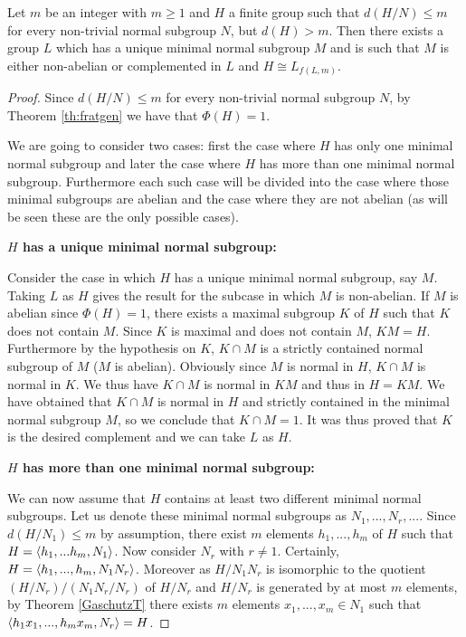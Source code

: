 \begin{theorem}
    Let $m$ be an integer with $m \ge 1$ and $H$ a finite group such that $d(H/N) \le m$ for every non-trivial normal subgroup $N$, but $d(H) > m$. Then there exists a group $L$ which has a unique minimal normal subgroup $M$ and is such that $M$ is either non-abelian or complemented in $L$ and $H \cong L_{f(L,m)}$.
\end{theorem}
\begin{proof}
    Since $d(H/N) \le m$ for every non-trivial normal subgroup $N$, by Theorem \ref{th:fratgen} we have that $\Phi(H) = 1$.
    
    We are going to consider two cases: first the case where $H$ has only one minimal normal subgroup and later the case where $H$ has more than one minimal normal subgroup. Furthermore each such case will be divided into the case where those minimal subgroups are abelian and the case where they are not abelian (as will be seen these are the only possible cases).

    \vspace{\baselineskip}
    \noindent
    \textbf{$H$ has a unique minimal normal subgroup:}
    \vspace{\baselineskip}

    Consider the case in which $H$ has a unique minimal normal subgroup, say $M$. 
    Taking $L$ as $H$ gives the result for the subcase in which $M$ is non-abelian.
    If $M$ is abelian since $\Phi(H) = 1$, there exists a maximal subgroup $K$ of $H$ such that $K$ does not contain $M$. 
    Since $K$ is maximal and does not contain $M$, $KM = H$. 
    Furthermore by the hypothesis on $K$, $K \cap M$ is a strictly contained normal subgroup of $M$ ($M$ is abelian). Obviously since $M$ is normal in $H$, $K \cap M$ is normal in $K$. We thus have $K \cap M$ is normal in $KM$ and thus in $H=KM$. We have obtained that $K \cap M$ is normal in $H$ and strictly contained in the minimal normal subgroup $M$, so we conclude that $K \cap M = 1$. It was thus proved that $K$ is the desired complement and we can take $L$ as $H$.   

    \vspace{\baselineskip}
    \noindent
    \textbf{$H$ has more than one minimal normal subgroup:}
    \vspace{\baselineskip}

    We can now assume that $H$ contains at least two different minimal normal subgroups. 
    Let us denote these minimal normal subgroups as $N_1, ...,N_r, ...$. 
    Since $d(H/N_1) \le m$ by assumption, there exist $m$ elements $h_1,...,h_m$ of $H$ such that $H = \langle h_1,...h_m, N_1 \rangle$. Now consider $N_r$ with $r \ne 1$. Certainly, $H = \langle h_1,...,h_m,N_1N_r \rangle$. Moreover as $H/N_1N_r$ is isomorphic to the quotient $(H/N_r)/(N_1N_r/N_r)$ of $H/N_r$ and $H/N_r$ is generated by at most $m$ elements, by Theorem \ref{GaschutzT} there exists $m$ elements $x_1,...,x_m \in N_1$ such that $\langle h_1x_1,...,h_mx_m,N_r \rangle = H$.


\end{proof}
